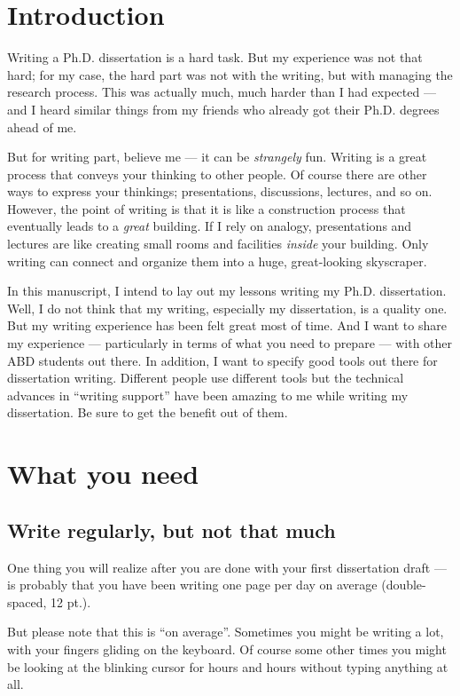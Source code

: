 \documentclass[11pt]{article}
\begin{document}
\section{Introduction}

Writing a Ph.D. dissertation is a hard task. But my experience was not
that hard; for my case, the hard part was not with the writing, but with
managing the research process. This was actually much, much harder than I had
expected --- and I heard similar things from my friends who already got
their Ph.D. degrees ahead of me.

But for writing part, believe me --- it can be \emph{strangely} fun.  Writing is
a great process that conveys your thinking to other people.  Of course there are
other ways to express your thinkings; presentations, discussions, lectures, and
so on. However, the point of writing is that it is like a construction process that
eventually leads to a \emph{great} building.  If I rely on analogy,
presentations and lectures are like creating small rooms and facilities
\emph{inside} your building. Only writing can connect and organize them into a
huge, great-looking skyscraper.

In this manuscript, I intend to lay out my lessons writing my Ph.D.
dissertation. Well, I do not think that my writing, especially my
dissertation, is a quality one. But my writing experience has been felt great
most of time. And I want to share my experience --- particularly in terms of
what you need to prepare --- with other ABD students out there. In
addition, I want to specify good tools out there for dissertation
writing. Different people use different tools but the technical advances
in ``writing support'' have been amazing to me while writing my dissertation.
Be sure to get the benefit out of them.

\section{What you need}

\subsection{Write regularly, but not that much}
One thing you will realize after you are done with your first
dissertation draft --- is probably that you have been writing one
page per day on average (double-spaced, 12 pt.).

But please note that this is ``on average''. Sometimes you might be
writing a lot, with your fingers gliding on the keyboard. Of course some
other times you might be looking at the blinking cursor for hours and hours
without typing anything at all. 
\end{document}
